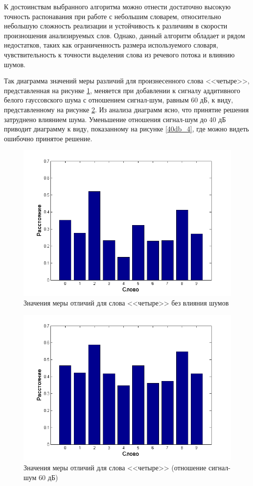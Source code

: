 \documentclass[a4paper,14pt,russian,utf8,nocolumnsxix,nocolumnxxxi,nocolumnxxxii]{eskdtext}
\begin{document}
К достоинствам выбранного алгоритма можно отнести достаточно высокую точность распонавания при работе с небольшим словарем, относительно небольшую сложность реализации и устойчивость к различиям в скорости произношения анализируемых слов. Однако, данный алгоритм обладает и рядом недостатков, таких как ограниченность размера используемого словаря, чувствительность к точности выделения слова из речевого потока и влиянию шумов.


Так диаграмма значений меры различий для произнесенного слова <<четыре>>, представленная на рисунке \ref{clear_4}, меняется при добавлении к сигналу аддитивного белого гауссовского шума с отношением сигнал-шум, равным 60 дБ, к виду, представленному на рисунке \ref{60db_4}. Из анализа диаграмм ясно, что принятие решения затруднено влиянием шума. Уменьшение отношения сигнал-шум до 40 дБ приводит диаграмму к виду, показанному на рисунке \ref{40db_4}, где можно видеть ошибочно принятое решение.

\begin{figure}[H]	
	\centering
	\includegraphics[width=120mm]{clear_4.png}			
	\caption{Значения меры отличий для слова <<четыре>> без влияния шумов}
	\label{clear_4}
\end{figure}

\begin{figure}[H]	
	\centering
	\includegraphics[width=120mm]{60db_4.png}			
	\caption{Значения меры отличий для слова <<четыре>> (отношение сигнал-шум 60 дБ)}
	\label{60db_4}
\end{figure}
\end{document}
